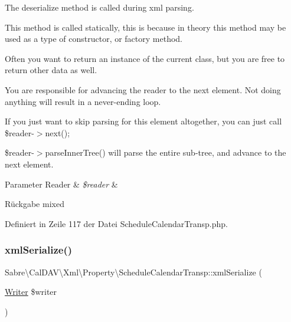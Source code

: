 The deserialize method is called during xml parsing.

This method is called statically, this is because in theory this method may be used as a type of constructor, or factory method.

Often you want to return an instance of the current class, but you are free to return other data as well.

You are responsible for advancing the reader to the next element. Not doing anything will result in a never-\/ending loop.

If you just want to skip parsing for this element altogether, you can just call \$reader-\/$>$next();

\$reader-\/$>$parse\+Inner\+Tree() will parse the entire sub-\/tree, and advance to the next element.


\begin{DoxyParams}[1]{Parameter}
Reader & {\em \$reader} & \\
\hline
\end{DoxyParams}
\begin{DoxyReturn}{Rückgabe}
mixed 
\end{DoxyReturn}


Definiert in Zeile 117 der Datei Schedule\+Calendar\+Transp.\+php.

\mbox{\label{class_sabre_1_1_cal_d_a_v_1_1_xml_1_1_property_1_1_schedule_calendar_transp_a921a17e0976f5b6050752784c5d77dc9}} 
\subsubsection{\texorpdfstring{xml\+Serialize()}{xmlSerialize()}}
{\footnotesize\ttfamily Sabre\textbackslash{}\+Cal\+D\+A\+V\textbackslash{}\+Xml\textbackslash{}\+Property\textbackslash{}\+Schedule\+Calendar\+Transp\+::xml\+Serialize (\begin{DoxyParamCaption}\item[{\mbox{\hyperlink{class_sabre_1_1_xml_1_1_writer}{Writer}}}]{\$writer }\end{DoxyParamCaption})}

